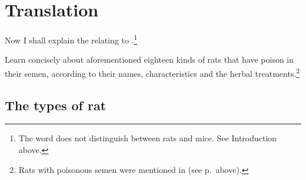\newpage

\section{Translation}

\begin{translation}
    
    \item[1] 
    
Now I shall explain the  relating to 
.\footnote{The word  does not distinguish 
between rats and mice.  See Introduction above.}
    
    \item[3] 
    
    Learn concisely about aforementioned eighteen kinds of rats that have 
    poison in their semen, according to their names, characteristics and the 
    herbal treatments.\footnote{Rats with poisonous semen were mentioned 
    in  (see p.\,\pageref{sukravisa} above).}
    
\subsection{The types of rat}
    \item[4--6]
    

\end{translation}
